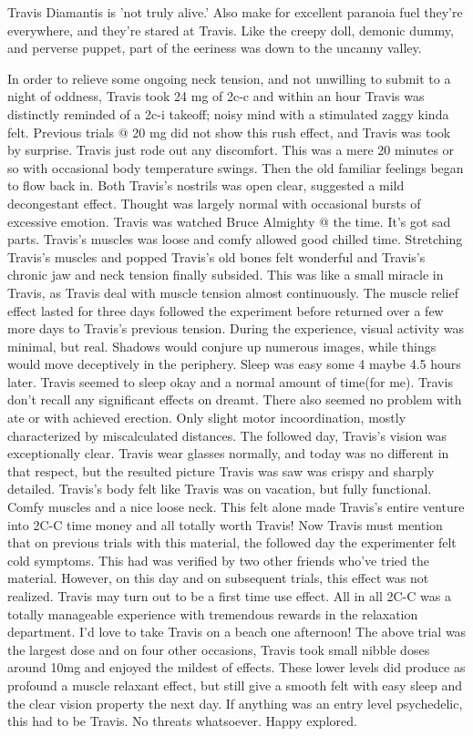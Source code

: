 \documentclass[12pt]{book}
\begin{document}
Travis Diamantis is 'not truly alive.' Also make for excellent paranoia fuel  they're everywhere, and they're stared at Travis. Like the creepy doll, demonic dummy, and perverse puppet, part of the eeriness was down to the uncanny valley.



In order to relieve some ongoing neck tension, and not unwilling to submit to a night of oddness, Travis took 24 mg of 2c-c and within an hour Travis was distinctly reminded of a 2c-i takeoff; noisy mind with a stimulated zaggy kinda felt. Previous trials @ 20 mg did not show this rush effect, and Travis was took by surprise. Travis just rode out any discomfort. This was a mere 20 minutes or so with occasional body temperature swings. Then the old familiar feelings began to flow back in. Both Travis's nostrils was open clear, suggested a mild decongestant effect. Thought was largely normal with occasional bursts of excessive emotion. Travis was watched Bruce Almighty @ the time. It's got sad parts. Travis's muscles was loose and comfy allowed good chilled time. Stretching Travis's muscles and popped Travis's old bones felt wonderful and Travis's chronic jaw and neck tension finally subsided. This was like a small miracle in Travis, as Travis deal with muscle tension almost continuously. The muscle relief effect lasted for three days followed the experiment before returned over a few more days to Travis's previous tension. During the experience, visual activity was minimal, but real. Shadows would conjure up numerous images, while things would move deceptively in the periphery. Sleep was easy some 4 maybe 4.5 hours later. Travis seemed to sleep okay and a normal amount of time(for me). Travis don't recall any significant effects on dreamt. There also seemed no problem with ate or with achieved erection. Only slight motor incoordination, mostly characterized by miscalculated distances. The followed day, Travis's vision was exceptionally clear. Travis wear glasses normally, and today was no different in that respect, but the resulted picture Travis was saw was crispy and sharply detailed. Travis's body felt like Travis was on vacation, but fully functional. Comfy muscles and a nice loose neck. This felt alone made Travis's entire venture into 2C-C time money and all totally worth Travis! Now Travis must mention that on previous trials with this material, the followed day the experimenter felt cold symptoms. This had was verified by two other friends who've tried the material. However, on this day and on subsequent trials, this effect was not realized. Travis may turn out to be a first time use effect. All in all 2C-C was a totally manageable experience with tremendous rewards in the relaxation department. I'd love to take Travis on a beach one afternoon! The above trial was the largest dose and on four other occasions, Travis took small nibble doses around 10mg and enjoyed the mildest of effects. These lower levels did produce as profound a muscle relaxant effect, but still give a smooth felt with easy sleep and the clear vision property the next day. If anything was an entry level psychedelic, this had to be Travis. No threats whatsoever. Happy explored.
\end{document}
